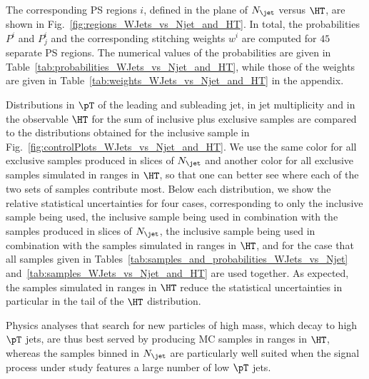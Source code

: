The corresponding PS regions $i$, defined in the plane of $N_{\jet}$ versus $\HT$, are shown in Fig.~\ref{fig:regions_WJets_vs_Njet_and_HT}.
In total, the probabilities $P^{i}$ and $P_{j}^{i}$ and the corresponding stitching weights $w^{i}$ are computed for $45$ separate PS regions.
The numerical values of the probabilities are given in Table~\ref{tab:probabilities_WJets_vs_Njet_and_HT}, 
while those of the weights are given in Table~\ref{tab:weights_WJets_vs_Njet_and_HT} in the appendix.

Distributions in $\pT$ of the leading and subleading jet,
in jet multiplicity and in the observable $\HT$ 
for the sum of inclusive plus exclusive samples are compared to the distributions obtained for the inclusive sample in Fig.~\ref{fig:controlPlots_WJets_vs_Njet_and_HT}.
We use the same color for all exclusive samples produced in slices of $N_{\jet}$ and another color for all exclusive samples simulated in ranges in $\HT$,
so that one can better see where each of the two sets of samples contribute most.
Below each distribution, we show the relative statistical uncertainties for four cases,
corresponding to only the inclusive sample being used, the inclusive sample being used in combination with the samples produced in slices of $N_{\jet}$,
the inclusive sample being used in combination with the samples simulated in ranges in $\HT$,
and for the case that all samples given in Tables~\ref{tab:samples_and_probabilities_WJets_vs_Njet} and~\ref{tab:samples_WJets_vs_Njet_and_HT} are used together.
As expected, the samples simulated in ranges in $\HT$ reduce the statistical uncertainties in particular in the tail of the $\HT$ distribution.

Physics analyses that search for new particles of high mass, which decay to high $\pT$ jets, are thus best served by producing MC samples in ranges in $\HT$,
whereas the samples binned in $N_{\jet}$ are particularly well suited when the signal process under study features a large number of low $\pT$ jets.

